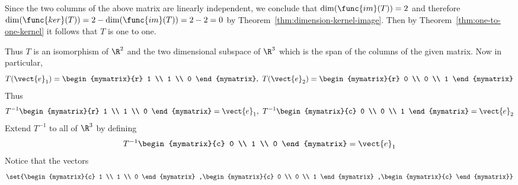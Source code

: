 \begin{solution}
Since the two columns of the above matrix are linearly independent, we conclude that $\dim(\func{im}(T)) = 2$ and therefore $\dim(\func{ker}(T)) = 2 - \dim(\func{im}(T)) = 2-2 = 0$ by Theorem~\ref{thm:dimension-kernel-image}. Then by Theorem~\ref{thm:one-to-one-kernel} it follows that $T$ is one to one. 

Thus $T$ is an isomorphism of $\R^{2}$ and the two dimensional subspace of $\R^{3}$ which is the
span of the columns of the given matrix. Now in particular, 
\begin{equation*}
T(\vect{e}_{1})=\begin{mymatrix}{r}
1 \\ 
1 \\ 
0
\end{mymatrix} ,\ T(\vect{e}_{2})=\begin{mymatrix}{r}
0 \\ 
0 \\ 
1
\end{mymatrix}
\end{equation*}
Thus 
\begin{equation*}
T^{-1}\begin{mymatrix}{r}
1 \\ 
1 \\ 
0
\end{mymatrix} =\vect{e}_{1},\ T^{-1}\begin{mymatrix}{c}
0 \\ 
0 \\ 
1
\end{mymatrix} =\vect{e}_{2}
\end{equation*}
Extend $T^{-1}$ to all of $\R^{3}$ by defining 
\begin{equation*}
T^{-1}\begin{mymatrix}{c}
0 \\ 
1 \\ 
0
\end{mymatrix} =\vect{e}_{1}
\end{equation*}
Notice that the vectors
\begin{equation*}
\set{\begin{mymatrix}{c}
1 \\ 
1 \\ 
0
\end{mymatrix} ,\begin{mymatrix}{c}
0 \\ 
0 \\ 
1
\end{mymatrix} ,\begin{mymatrix}{c}

\end{mymatrix}}
\end{equation*}
\end{solution}
